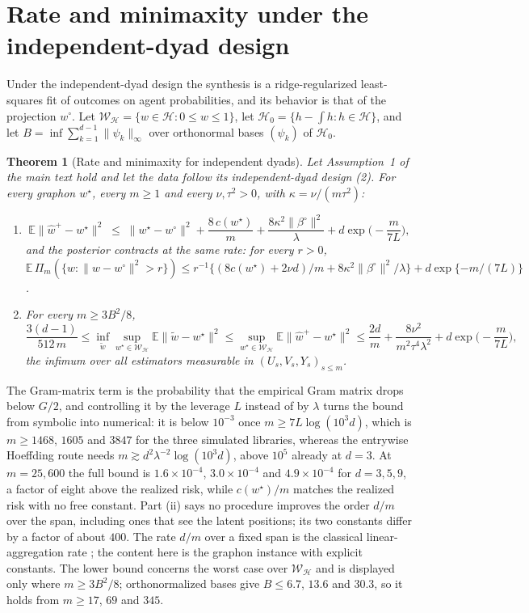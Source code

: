 \documentclass[12pt]{article}
\newcommand{\E}{\mathbb{E}}
\newcommand{\calH}{\mathcal{H}}
\newcommand{\calW}{\mathcal{W}}
\newcommand{\supn}[1]{\|#1\|_{\infty}}
\newcommand{\norm}[1]{\|#1\|}
\newcommand{\wstar}{w^{\star}}
\newcommand{\wproj}{w^{\circ}}
\newcommand{\bproj}{\beta^{\circ}}
\newcommand{\whatp}{\hat w^{+}}
\newtheorem{theoremS}{Theorem}
\begin{document}
\section{Rate and minimaxity under the independent-dyad design}
\label{sec:S0}

Under the independent-dyad design the synthesis is a ridge-regularized least-squares fit of outcomes on agent probabilities, and its behavior is that of the projection $\wproj$. Let $\calW_{\calH}=\{w\in\calH:0\le w\le1\}$, let $\calH_0=\{h-\int h:h\in\calH\}$, and let $B=\inf\sum_{k=1}^{d-1}\supn{\psi_k}$ over orthonormal bases $(\psi_k)$ of $\calH_0$.

\begin{theoremS}[Rate and minimaxity for independent dyads]
\label{thm:minimaxS}
Let Assumption~1 of the main text hold and let the data follow its independent-dyad design (2). For every graphon $\wstar$, every $m\ge1$ and every $\nu,\tau^2>0$, with $\kappa=\nu/(m\tau^2)$:
\begin{enumerate}
\item[(i)]
\begin{equation}
\label{eq:rate}
\E\norm{\whatp-\wstar}^2\;\le\;\norm{\wstar-\wproj}^2+\frac{8\,c(\wstar)}{m}+\frac{8\kappa^2\norm{\bproj}^2}{\lambda}+d\exp\Big(-\frac{m}{7L}\Big),
\end{equation}
and the posterior contracts at the same rate: for every $r>0$, $\E\,\Pi_m(\{w:\norm{w-\wproj}^2>r\})\le r^{-1}\{(8c(\wstar)+2\nu d)/m+8\kappa^2\norm{\bproj}^2/\lambda\}+d\exp\{-m/(7L)\}$.
\item[(ii)] For every $m\ge3B^2/8$,
\[
\frac{3(d-1)}{512\,m}\le\inf_{\tilde w}\sup_{\wstar\in\calW_{\calH}}\E\norm{\tilde w-\wstar}^2\le\sup_{\wstar\in\calW_{\calH}}\E\norm{\whatp-\wstar}^2\le\frac{2d}{m}+\frac{8\nu^2}{m^2\tau^4\lambda^2}+d\exp\Big(-\frac{m}{7L}\Big),
\]
the infimum over all estimators measurable in $(U_s,V_s,Y_s)_{s\le m}$.
\end{enumerate}
\end{theoremS}

The Gram-matrix term is the probability that the empirical Gram matrix drops below $G/2$, and controlling it by the leverage $L$ instead of by $\lambda$ turns the bound from symbolic into numerical: it is below $10^{-3}$ once $m\ge7L\log(10^{3}d)$, which is $m\ge1468$, $1605$ and $3847$ for the three simulated libraries, whereas the entrywise Hoeffding route needs $m\gtrsim d^2\lambda^{-2}\log(10^{3}d)$, above $10^{5}$ already at $d=3$. At $m=25{,}600$ the full bound is $1.6\times10^{-4}$, $3.0\times10^{-4}$ and $4.9\times10^{-4}$ for $d=3,5,9$, a factor of eight above the realized risk, while $c(\wstar)/m$ matches the realized risk with no free constant. Part (ii) says no procedure improves the order $d/m$ over the span, including ones that see the latent positions; its two constants differ by a factor of about $400$. The rate $d/m$ over a fixed span is the classical linear-aggregation rate \citep{Tsybakov2003, BuneaTsybakovWegkamp2007}; the content here is the graphon instance with explicit constants. The lower bound concerns the worst case over $\calW_{\calH}$ and is displayed only where $m\ge3B^2/8$; orthonormalized bases give $B\le6.7$, $13.6$ and $30.3$, so it holds from $m\ge17$, $69$ and $345$.
\end{document}
